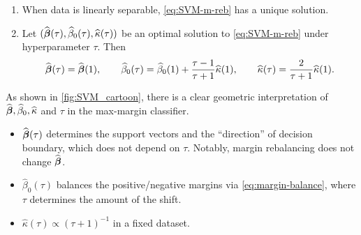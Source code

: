 \begin{prop}\label{prop:SVM_tau_relation}
	\begin{enumerate}[label=(\alph*)]
		\item %
            When data is linearly separable, \cref{eq:SVM-m-reb} has a unique solution.
            \item %
            Let $(\widehat{{\boldsymbol{\beta}}}(\tau), \widehat\beta_0(\tau), \widehat\kappa(\tau))$ be an optimal solution to \cref{eq:SVM-m-reb} under hyperparameter $\tau$. Then
        \begin{equation}\label{eq:margin-balance}
		    \widehat{{\boldsymbol{\beta}}}(\tau) = \widehat{{\boldsymbol{\beta}}}(1),
        \qquad
        \widehat\beta_{0}(\tau) = \widehat\beta_{0}(1) + \frac{\tau - 1}{\tau + 1} \widehat\kappa(1),
        \qquad
        \widehat\kappa(\tau) = \frac{2}{\tau + 1} \widehat\kappa(1).
		\end{equation}
	\end{enumerate}
\end{prop}


\begin{rem}
	As shown in \cref{fig:SVM_cartoon}, there is a clear geometric interpretation of $\widehat{{\boldsymbol{\beta}}}, \widehat\beta_0, \widehat\kappa$ and $\tau$ in the max-margin classifier.
	\begin{itemize}
		\item $\widehat{{\boldsymbol{\beta}}}(\tau)$ determines the support vectors and the ``direction'' of decision boundary, which does not depend on $\tau$. Notably, margin rebalancing does not change $\widehat{{\boldsymbol{\beta}}}$.
		\item $\hat\beta_0(\tau)$ balances the positive/negative margins via \cref{eq:margin-balance}, where $\tau$ determines the amount of the shift.
		\item $\hat\kappa(\tau) \propto (\tau + 1)^{-1}$ in a fixed dataset.
	\end{itemize}
\end{rem}


